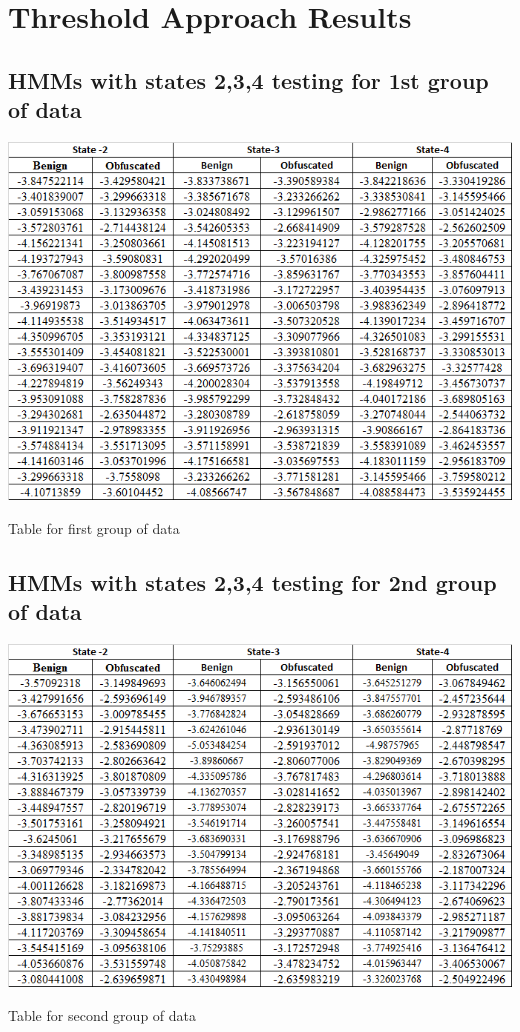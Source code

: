 \chapter{Threshold Approach Results\label{app:a}}

\section{HMMs with states 2,3,4 testing for 1st group of data}
\begin{table}
\centering
\includegraphics[width=1.0\textwidth]{images/a_1.png}
\caption{Table for first group of data} 
\label{table:Table for first group of data}
\end{table}
\pagebreak

\section{HMMs with states 2,3,4 testing for 2nd group of data}
\begin{table}
\centering
\includegraphics[width=1.0\textwidth]{images/a_2.png}
\caption{Table for second group of data} 
\label{table:Table for second group of data}
\end{table}
\pagebreak

